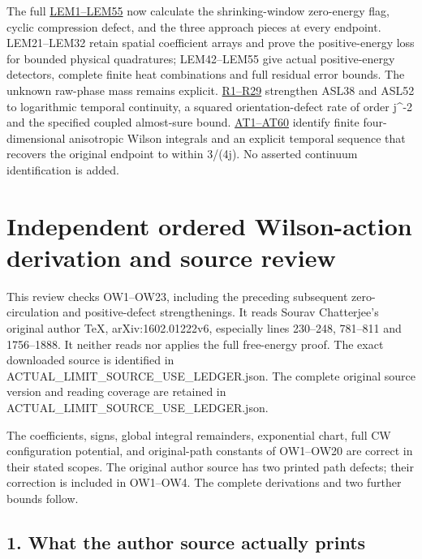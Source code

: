 \documentclass[11pt]{article}
\begin{document}
The full \href{https://github.com/KokunoYumeto/yang-mills-interacting-workbench/blob/main/yang-mills/continuations/20261011-central-signs-shrinking-window/ACTUAL_LOW_ENERGY_MAPS.md}{LEM1–LEM55} now calculate the shrinking-window zero-energy flag, cyclic compression defect, and the three approach pieces at every endpoint. LEM21–LEM32 retain spatial coefficient arrays and prove the positive-energy loss for bounded physical quadratures; LEM42–LEM55 give actual positive-energy detectors, complete finite heat combinations and full residual error bounds. The unknown raw-phase mass remains explicit. \href{https://github.com/KokunoYumeto/yang-mills-interacting-workbench/blob/main/yang-mills/continuations/20261011-central-signs-shrinking-window/WILSON_TIME_REVIEW.md}{R1–R29} strengthen ASL38 and ASL52 to logarithmic temporal continuity, a squared orientation-defect rate of order j\textasciicircum{}-2 and the specified coupled almost-sure bound. \href{https://github.com/KokunoYumeto/yang-mills-interacting-workbench/blob/main/yang-mills/continuations/20261011-central-signs-shrinking-window/ANISOTROPIC_TEMPORAL_BRIDGE.md}{AT1–AT60} identify finite four-dimensional anisotropic Wilson integrals and an explicit temporal sequence that recovers the original endpoint to within 3/(4j). No asserted continuum identification is added.
\clearpage
\section*{Independent ordered Wilson-action derivation and source review}

This review checks OW1–OW23, including the preceding subsequent zero-circulation and positive-defect strengthenings. It reads Sourav Chatterjee's original author TeX, arXiv:1602.01222v6, especially lines 230–248, 781–811 and 1756–1888. It neither reads nor applies the full free-energy proof. The exact downloaded source is identified in ACTUAL\_LIMIT\_SOURCE\_USE\_LEDGER.json. The complete original source version and reading coverage are retained in ACTUAL\_LIMIT\_SOURCE\_USE\_LEDGER.json.

The coefficients, signs, global integral remainders, exponential chart, full CW configuration potential, and original-path constants of OW1–OW20 are correct in their stated scopes. The original author source has two printed path defects; their correction is included in OW1–OW4. The complete derivations and two further bounds follow.

\subsection*{1. What the author source actually prints}
\end{document}
